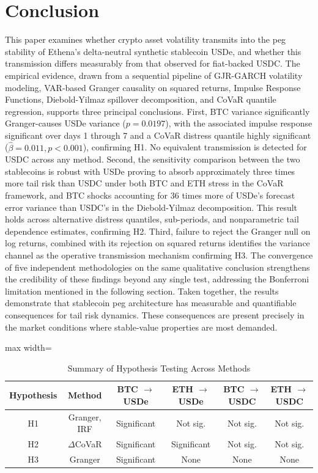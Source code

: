 \documentclass[12pt,a4paper,titlepage,oneside,english]{article}
\begin{document}
\section{Conclusion}
This paper examines whether crypto asset volatility transmits into the peg stability of Ethena's delta-neutral synthetic stablecoin USDe, and whether this transmission differs measurably from that observed for fiat-backed USDC. The empirical evidence, drawn from a sequential pipeline of GJR-GARCH volatility modeling, VAR-based Granger causality on squared returns, Impulse Response Functions, Diebold-Yilmaz spillover decomposition, and CoVaR quantile regression, supports three principal conclusions. First, BTC variance significantly Granger-causes USDe variance ($p=0.0197$), with the associated impulse response significant over days 1 through 7 and a CoVaR distress quantile highly significant ($\hat{\beta} = 0.011, p<0.001$), confirming H1. No equivalent transmission is detected for USDC across any method. Second, the sensitivity comparison between the two stablecoins is robust with USDe proving to absorb approximately three times more tail risk than USDC under both BTC and ETH stress in the CoVaR framework, and BTC shocks accounting for 36 times more of USDe's forecast error variance than USDC's in the Diebold-Yilmaz decomposition. This result holds across alternative distress quantiles, sub-periods, and nonparametric tail dependence estimates, confirming H2. Third, failure to reject the Granger null on log returns, combined with its rejection on squared returns identifies the variance channel as the operative transmission mechanism confirming H3. The convergence of five independent methodologies on the same qualitative conclusion strengthens the credibility of these findings beyond any single test, addressing the Bonferroni limitation mentioned in the following section. Taken together, the results demonstrate that stablecoin peg architecture has measurable and quantifiable consequences for tail risk dynamics. These consequences are present precisely in the market conditions where stable-value properties are most demanded.
\begin{table}[H]
    \centering
    \begin{adjustbox}{max width=\textwidth}
    \begin{tabular}{cccccc}
    \toprule
        Hypothesis & Method & BTC $\rightarrow$ USDe & ETH $\rightarrow$ USDe & BTC $\rightarrow$ USDC & ETH $\rightarrow$ USDC \\
    \midrule
        H1 & Granger, IRF & Significant & Not sig. & Not sig. & Not sig. \\
        H2 & $\Delta$CoVaR & Significant & Significant & Not sig. & Not sig. \\
        H3 & Granger & Significant & None & None & None \\
    \bottomrule
    \end{tabular}
    \end{adjustbox}
    \caption{Summary of Hypothesis Testing Across Methods}
    \label{tab:hypothesis_summary}
\end{table}
\end{document}
